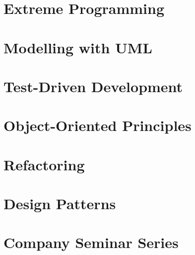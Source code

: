 \documentclass[]{UCD_CS_FYP_Report}
\begin{document}
\maketitle

\tableofcontents{}\newpage
\newpage

\chapter{Extreme Programming}


\chapter{Modelling with UML}


\chapter{Test-Driven Development}


\chapter{Object-Oriented Principles}


\chapter{Refactoring}


\chapter{Design Patterns}


\chapter{Company Seminar Series}


\newpage


\label{endpage}
\end{document}
